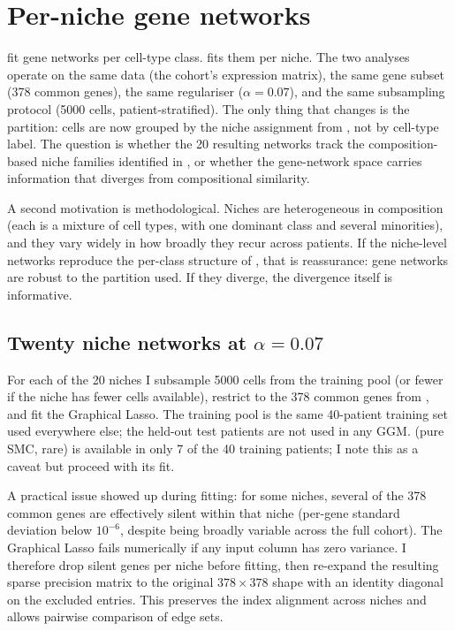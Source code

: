 \section{Per-niche gene networks}
\label{sec:part5}

 fit gene networks per cell-type class.  fits them per niche. The two analyses operate on the same data (the cohort's expression matrix), the same gene subset (378 common genes), the same regulariser ($\alpha = 0.07$), and the same subsampling protocol (5000 cells, patient-stratified). The only thing that changes is the partition: cells are now grouped by the niche assignment from , not by cell-type label. The question is whether the 20 resulting networks track the composition-based niche families identified in , or whether the gene-network space carries information that diverges from compositional similarity.

A second motivation is methodological. Niches are heterogeneous in composition (each is a mixture of cell types, with one dominant class and several minorities), and they vary widely in how broadly they recur across patients. If the niche-level networks reproduce the per-class structure of , that is reassurance: gene networks are robust to the partition used. If they diverge, the divergence itself is informative.

\subsection*{Twenty niche networks at \texorpdfstring{$\alpha = 0.07$}{alpha=0.07}}

For each of the 20 niches I subsample 5000 cells from the training pool (or fewer if the niche has fewer cells available), restrict to the 378 common genes from , and fit the Graphical Lasso. The training pool is the same 40-patient training set used everywhere else; the held-out test patients are not used in any GGM.  (pure SMC, rare) is available in only 7 of the 40 training patients; I note this as a caveat but proceed with its fit.

A practical issue showed up during fitting: for some niches, several of the 378 common genes are effectively silent within that niche (per-gene standard deviation below $10^{-6}$, despite being broadly variable across the full cohort). The Graphical Lasso fails numerically if any input column has zero variance. I therefore drop silent genes per niche before fitting, then re-expand the resulting sparse precision matrix to the original $378 \times 378$ shape with an identity diagonal on the excluded entries. This preserves the index alignment across niches and allows pairwise comparison of edge sets.


